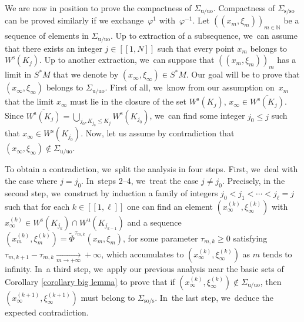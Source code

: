 \documentclass[JEP,XML,SOM,Unicode,NoEqCountersInSection,NoFloatCountersInSection,published]{cedram}
\newcommand{\lcr}{[\![}
\newcommand{\rcr}{]\!]}
\newcommand{\rs}{\mathrm{s}}
\newcommand{\rso}{\mathrm{so}}
\newcommand{\ru}{\mathrm{u}}
\newcommand{\ruo}{\mathrm{uo}}
\theoremstyle{definition}
\theoremstyle{plain}
\newcommand{\N}{\mathbb{N}}
\begin{document}
We are now in position to prove the compactness of $\Sigma_{\ru/\ruo}$. Compactness of $\Sigma_{\rs/\rso}$ can be proved similarly if we exchange~$\varphi^1$ with~$\varphi^{-1}$. Let $((x_m, \xi_m))_{m \in \N}$ be a sequence of elements in $\Sigma_{\ru/\ruo}$. Up to extraction of a subsequence, we~can assume that there exists an integer $j\in\lcr1,N\rcr$ such that every point $x_m$ belongs to $W^\rs (K_j)$. Up to another extraction, we~can suppose that $((x_m,\xi_m))_m$ has a limit in $S^*M$ that we denote by $(x_{\infty},\xi_{\infty}) \in S^*M$. Our goal will be to prove that $(x_{\infty}, \xi_{\infty})$ belongs to $\Sigma_{\ru/\ruo}$. First of all, we~know from our assumption on~$x_m$ that the limit $x_{\infty}$ must lie in the closure of the set $ W^\rs (K_j)$, \ie $x_{\infty} \in \overline{W^\rs (K_j)}$. Since $\overline{W^\rs (K_j)} = \bigcup_{j_0, K_{j_0} \leq K_j} W^\rs (K_{j_0})$, we~can find some integer $j_0 \leq j$ such that $x_{\infty} \in W^\rs (K_{j_0})$. Now, let us assume by contradiction that $(x_{\infty},\xi_{\infty}) \notin \Sigma_{\ru/\ruo}$.

To obtain a contradiction, we~split the analysis in four steps. First, we~deal with the case where $j = j_0$. In~steps 2--4, we~treat the case $j \neq j_0$. Precisely, in the second step, we~construct by induction a family of integers $j_0 < j_1 < \cdots < j_{\ell} = j$ such that for each $k\in\lcr1,\ell\rcr$ one can find an element $(x_{\infty}^{(k)}, \xi_{\infty}^{(k)})$ with $x_{\infty}^{(k)} \in W^\rs (K_{j_k}) \cap W^\ru (K_{j_{k-1}})$ and a sequence $(x_m^{(k)},\xi_m^{(k)}) = \widetilde{\Phi}^{\tau_{m,k}} (x_m,\xi_m)$, for some parameter $ \tau_{m,k} \geq 0$ satisfying $\tau_{m,k +1} - \tau_{m,k} \underset{m\to+\infty}{\to} + \infty$, which accumulates to $(x_{\infty}^{(k)},\xi_{\infty}^{(k)})$ as $m$ tends to infinity. In~a third step, we~apply our previous analysis near the basic sets of Corollary \ref{corollary big lemma} to prove that if $(x_{\infty}^{(k)},\xi_{\infty}^{(k)}) \notin \Sigma_{\ru/\ruo}$, then $(x_{\infty}^{(k+1)}, \xi_{\infty}^{(k+1)})$ must belong to $\Sigma_{\rso/\rs}$. In~the last step, we~deduce the expected contradiction.
\end{document}
